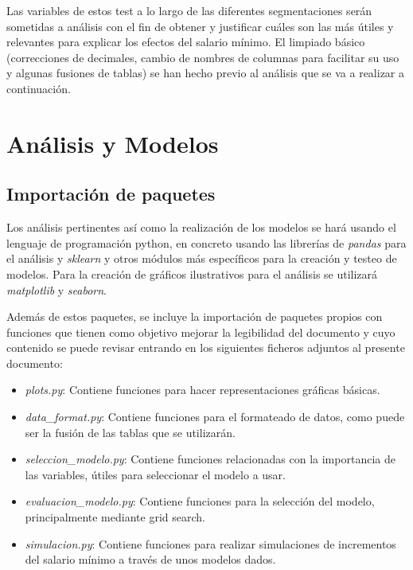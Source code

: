 \documentclass[11pt]{article}
\begin{document}
Las variables de estos test a lo largo de las diferentes segmentaciones
serán sometidas a análisis con el fin de obtener y justificar cuáles son
las más útiles y relevantes para explicar los efectos del salario
mínimo. El limpiado básico (correcciones de decimales, cambio de nombres
de columnas para facilitar su uso y algunas fusiones de tablas) se han
hecho previo al análisis que se va a realizar a continuación.

    \section{Análisis y Modelos}\label{anuxe1lisis-y-modelos}

    \subsection{Importación de paquetes}\label{importaciuxf3n-de-paquetes}

Los análisis pertinentes así como la realización de los modelos se hará
usando el lenguaje de programación python, en concreto usando las
librerías de \emph{pandas} para el análisis y \emph{sklearn} y otros
módulos más específicos para la creación y testeo de modelos. Para la
creación de gráficos ilustrativos para el análisis se utilizará
\emph{matplotlib} y \emph{seaborn}.

Además de estos paquetes, se incluye la importación de paquetes propios
con funciones que tienen como objetivo mejorar la legibilidad del
documento y cuyo contenido se puede revisar entrando en los siguientes
ficheros adjuntos al presente documento:

\begin{itemize}
\item
  \emph{plots.py}: Contiene funciones para hacer representaciones
  gráficas básicas.
\item
  \emph{data\_format.py}: Contiene funciones para el formateado de
  datos, como puede ser la fusión de las tablas que se utilizarán.
\item
  \emph{seleccion\_modelo.py}: Contiene funciones relacionadas con la
  importancia de las variables, útiles para seleccionar el modelo a
  usar.
\item
  \emph{evaluacion\_modelo.py}: Contiene funciones para la selección del
  modelo, principalmente mediante grid search.
\item
  \emph{simulacion.py}: Contiene funciones para realizar simulaciones de
  incrementos del salario mínimo a través de unos modelos dados.
\end{itemize}
\end{document}
